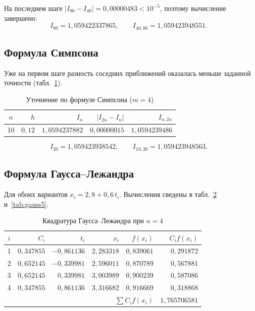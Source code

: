 \documentclass[14pt,a4paper]{extarticle}
\begin{document}
На последнем шаге $|I_{80}-I_{40}|=0{,}00000483<10^{-5}$, поэтому
вычисление завершено:
\begin{equation}
    I_{80}=1{,}059422337865,\qquad
    I_{40,80}=1{,}059423948551 .
\end{equation}

\subsection{Формула Симпсона}

Уже на первом шаге разность соседних приближений оказалась меньше
заданной точности (табл.~\ref{tab:simpson}).

\begin{table}[H]
    \centering
    \caption{Уточнение по формуле Симпсона ($m=4$)}
    \label{tab:simpson}
    \small
    \begin{tabular}{crrrr}
        \toprule
        $n$ & $h$ & $I_n$ & $|I_{2n}-I_n|$ & $I_{n,2n}$\\
        \midrule
        10 & $0{,}12$ & $1{,}0594237882$ & $0{,}00000015$ & $1{,}0594239486$\\
        \bottomrule
    \end{tabular}
\end{table}

\begin{equation}
    I_{20}=1{,}059423938542,\qquad
    I_{10,20}=1{,}059423948563 .
\end{equation}

\subsection{Формула Гаусса--Лежандра}

Для обоих вариантов $x_i=2{,}8+0{,}6\,t_i$. Вычисления сведены
в табл.~\ref{tab:gauss4} и~\ref{tab:gauss5}.

\begin{table}[H]
    \centering
    \caption{Квадратура Гаусса--Лежандра при $n=4$}
    \label{tab:gauss4}
    \small
    \begin{tabular}{crrrrr}
        \toprule
        $i$ & $C_i$ & $t_i$ & $x_i$ & $f(x_i)$ & $C_i f(x_i)$\\
        \midrule
        1 & $0{,}347855$ & $-0{,}861136$ & $2{,}283318$ & $0{,}839061$ & $0{,}291872$\\
        2 & $0{,}652145$ & $-0{,}339981$ & $2{,}596011$ & $0{,}870789$ & $0{,}567881$\\
        3 & $0{,}652145$ & $ 0{,}339981$ & $3{,}003989$ & $0{,}900239$ & $0{,}587086$\\
        4 & $0{,}347855$ & $ 0{,}861136$ & $3{,}316682$ & $0{,}916669$ & $0{,}318868$\\
        \midrule
        \multicolumn{5}{r}{$\sum C_i f(x_i)$} & $1{,}765706581$\\
        \bottomrule
    \end{tabular}
\end{table}
\end{document}
